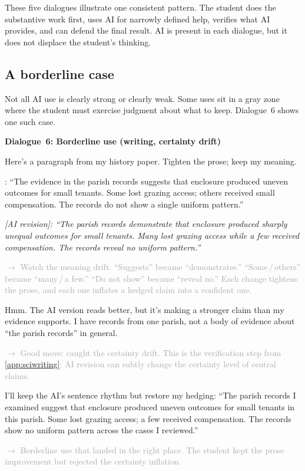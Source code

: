 \documentclass{SIAMbook2023}
\newenvironment{dialogue}[1]%
  {\par\medskip\noindent\textbf{\textcolor{guideblue}{#1}}\par\smallskip
   \begin{list}{}{\setlength{\leftmargin}{1.5em}\setlength{\rightmargin}{0.5em}\setlength{\itemsep}{0.4em}\setlength{\topsep}{0pt}}}
  {\end{list}\par\medskip}
\newcommand{\studentturn}[1]{\item[\textbf{Student.}] #1}
\newcommand{\aiturn}[1]{\item[\textbf{AI.}] \textit{#1}}
\newcommand{\dialogueannotate}[1]{\par\smallskip\hspace{2em}\textcolor{darkgray}{\footnotesize\textsf{$\rightarrow$ #1}}\par}
\begin{document}
These five dialogues illustrate one consistent pattern. The student does the substantive work first, uses AI for narrowly defined help, verifies what AI provides, and can defend the final result. AI is present in each dialogue, but it does not displace the student's thinking.

\subsection*{A borderline case}

Not all AI use is clearly strong or clearly weak. Some uses sit in a gray zone where the student must exercise judgment about what to keep. Dialogue~6 shows one such case.

\begin{dialogue}{Dialogue~6: Borderline use (writing, certainty drift)}
\studentturn{Here's a paragraph from my history paper. Tighten the prose; keep my meaning.}

\studentturn{[Student's original]: ``The evidence in the parish records suggests that enclosure produced uneven outcomes for small tenants. Some lost grazing access; others received small compensation. The records do not show a single uniform pattern.''}

\aiturn{[AI revision]: ``The parish records demonstrate that enclosure produced sharply unequal outcomes for small tenants. Many lost grazing access while a few received compensation. The records reveal no uniform pattern.''}
\dialogueannotate{Watch the meaning drift. ``Suggests'' became ``demonstrates.'' ``Some\,/\,others'' became ``many\,/\,a few.'' ``Do not show'' became ``reveal no.'' Each change tightens the prose, and each one inflates a hedged claim into a confident one.}

\studentturn{Hmm. The AI version reads better, but it's making a stronger claim than my evidence supports. I have records from one parish, not a body of evidence about ``the parish records'' in general.}
\dialogueannotate{Good move: caught the certainty drift. This is the verification step from \cref{app:sciwriting}: AI revision can subtly change the certainty level of central claims.}

\studentturn{I'll keep the AI's sentence rhythm but restore my hedging: ``The parish records I examined suggest that enclosure produced uneven outcomes for small tenants in this parish. Some lost grazing access; a few received compensation. The records show no uniform pattern across the cases I reviewed.''}
\dialogueannotate{Borderline use that landed in the right place. The student kept the prose improvement but rejected the certainty inflation.}
\end{dialogue}
\end{document}
